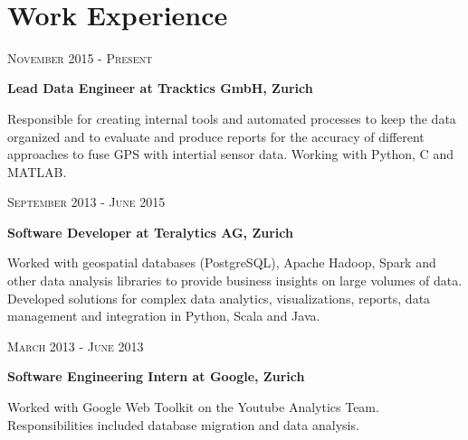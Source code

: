 \documentclass[10pt]{article} %
\begin{document}
\begin{minipage}[t]{0.5\textwidth}
\begin{tabular}{rl}
\end{tabular}\\[9pt]


\section{Work Experience} 

{\raggedleft\textsc{November 2015 - Present}\par}

{\raggedright\large \textbf{Lead Data Engineer at Tracktics GmbH, Zurich}\\
}

\normalsize{ Responsible for creating internal tools and automated processes to keep the data organized and to evaluate and produce reports for the accuracy of different approaches to fuse GPS with intertial sensor data. Working with Python, C and MATLAB.}

{\raggedleft\textsc{September 2013 - June 2015}\par}

{\raggedright\large \textbf{Software Developer at Teralytics AG, Zurich}\\
}

\normalsize{Worked with geospatial databases (PostgreSQL), Apache Hadoop, Spark and other data analysis libraries to provide business insights on large volumes of data. Developed solutions for complex data analytics, visualizations, reports, data management and integration in Python, Scala and Java.}

{\raggedleft\textsc{March 2013 - June 2013}\par}

{\raggedright\large \textbf{Software Engineering Intern at Google, Zurich}\\
}

\normalsize{Worked with Google Web Toolkit on the Youtube Analytics Team. Responsibilities included database migration and data analysis.}\\



\end{minipage}
\end{document}
